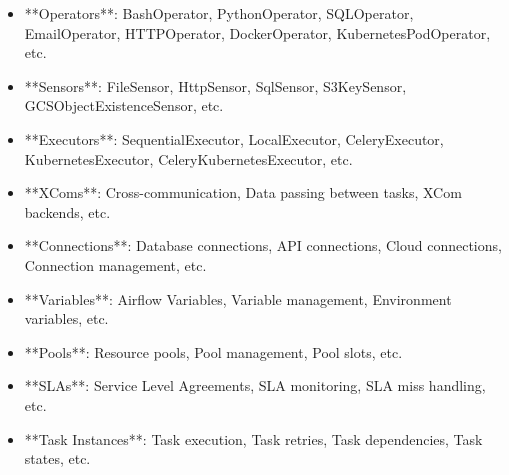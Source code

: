 \documentclass[11pt,a4paper]{article}
\begin{document}
\begin{itemize}
\item **Operators**: BashOperator, PythonOperator, SQLOperator, EmailOperator, HTTPOperator, DockerOperator, KubernetesPodOperator, etc.
\end{itemize}

\begin{itemize}
\item **Sensors**: FileSensor, HttpSensor, SqlSensor, S3KeySensor, GCSObjectExistenceSensor, etc.
\end{itemize}

\begin{itemize}
\item **Executors**: SequentialExecutor, LocalExecutor, CeleryExecutor, KubernetesExecutor, CeleryKubernetesExecutor, etc.
\end{itemize}

\begin{itemize}
\item **XComs**: Cross-communication, Data passing between tasks, XCom backends, etc.
\end{itemize}

\begin{itemize}
\item **Connections**: Database connections, API connections, Cloud connections, Connection management, etc.
\end{itemize}

\begin{itemize}
\item **Variables**: Airflow Variables, Variable management, Environment variables, etc.
\end{itemize}

\begin{itemize}
\item **Pools**: Resource pools, Pool management, Pool slots, etc.
\end{itemize}

\begin{itemize}
\item **SLAs**: Service Level Agreements, SLA monitoring, SLA miss handling, etc.
\end{itemize}

\begin{itemize}
\item **Task Instances**: Task execution, Task retries, Task dependencies, Task states, etc.
\end{itemize}
\end{document}
